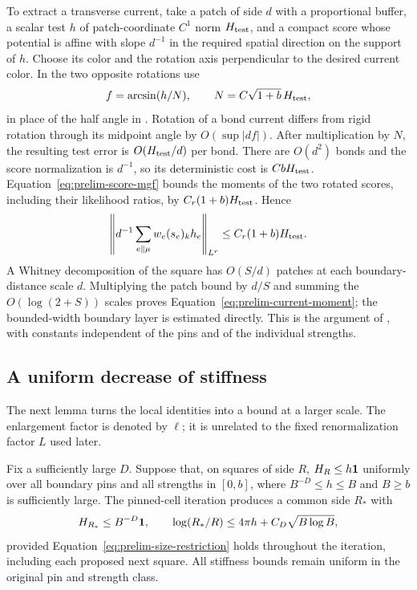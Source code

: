 To extract a transverse current, take a patch of side $d$ with a
proportional buffer, a scalar test $h$ of patch-coordinate $C^1$ norm
$H_{\rm test}$, and a compact score whose potential is affine with slope
$d^{-1}$ in the required spatial direction on the support of $h$.
Choose its color and the rotation axis perpendicular to the desired
current color. In the two opposite rotations use
\[
 f=\arcsin(h/N),\qquad N=C\sqrt{1+b}\,H_{\rm test},
\]
in place of the half angle in . Rotation of a bond
current differs from rigid rotation through its midpoint angle by
$O(\sup|df|)$. After multiplication by $N$, the resulting test error is
$O(H_{\rm test}/d)$ per bond. There are $O(d^2)$ bonds and the score
normalization is $d^{-1}$, so its deterministic cost is
$CbH_{\rm test}$. Equation~\eqref{eq:prelim-score-mgf} bounds the moments
of the two rotated scores, including their likelihood ratios, by
$C_r(1+b)H_{\rm test}$. Hence
\[
 \left\|d^{-1}\sum_{e\parallel\mu}w_e(s_e)_k h_e\right\|_{L^r}
 \le C_r(1+b)H_{\rm test}.
\]
A Whitney decomposition of the square has $O(S/d)$ patches at each
boundary-distance scale $d$. Multiplying the patch bound by $d/S$ and
summing the $O(\log(2+S))$ scales proves
Equation~\eqref{eq:prelim-current-moment}; the bounded-width boundary
layer is estimated directly. This is the argument of
, with constants independent of the pins and of the
individual strengths.

\subsection{A uniform decrease of stiffness}

The next lemma turns the local identities into a bound at a larger
scale. The enlargement factor is denoted by $\ell$; it is unrelated to
the fixed renormalization factor $L$ used later.

\begin{lemma}\label{lem:prelim-iteration}
Fix a sufficiently large $D$. Suppose that, on squares of side $R$,
$H_R\le h\mathbf 1$ uniformly over all boundary pins and all strengths in
$[0,b]$, where $B^{-D}\le h\le B$ and $B\ge b$ is sufficiently large.
The pinned-cell iteration produces a common side $R_*$ with
\begin{equation}
 H_{R_*}\le B^{-D}\mathbf 1,\qquad
 \log(R_*/R)\le4\pi h+C_D\sqrt{B\log B},
 \label{eq:prelim-iteration-conclusion}
\end{equation}
provided Equation~\eqref{eq:prelim-size-restriction} holds throughout
the iteration, including each proposed next square. All stiffness
bounds remain uniform in the original pin and strength class.
\end{lemma}

